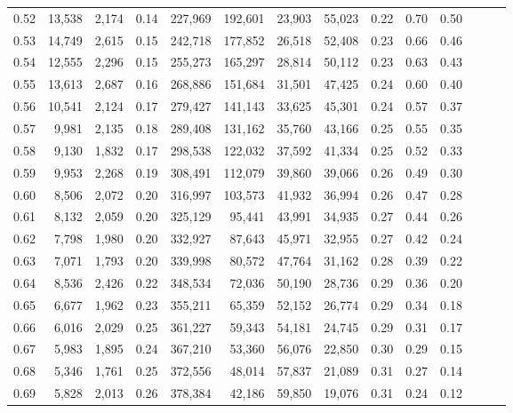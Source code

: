 \begin{tabular}{rrrrrrrrrrrrrr}
0.52 &  13,538 &  2,174 &  0.14 &  227,969 &  192,601 &  23,903 &  55,023 &  0.22 &  0.70 &      0.50 \\
0.53 &  14,749 &  2,615 &  0.15 &  242,718 &  177,852 &  26,518 &  52,408 &  0.23 &  0.66 &      0.46 \\
0.54 &  12,555 &  2,296 &  0.15 &  255,273 &  165,297 &  28,814 &  50,112 &  0.23 &  0.63 &      0.43 \\
0.55 &  13,613 &  2,687 &  0.16 &  268,886 &  151,684 &  31,501 &  47,425 &  0.24 &  0.60 &      0.40 \\
0.56 &  10,541 &  2,124 &  0.17 &  279,427 &  141,143 &  33,625 &  45,301 &  0.24 &  0.57 &      0.37 \\
0.57 &   9,981 &  2,135 &  0.18 &  289,408 &  131,162 &  35,760 &  43,166 &  0.25 &  0.55 &      0.35 \\
0.58 &   9,130 &  1,832 &  0.17 &  298,538 &  122,032 &  37,592 &  41,334 &  0.25 &  0.52 &      0.33 \\
0.59 &   9,953 &  2,268 &  0.19 &  308,491 &  112,079 &  39,860 &  39,066 &  0.26 &  0.49 &      0.30 \\
0.60 &   8,506 &  2,072 &  0.20 &  316,997 &  103,573 &  41,932 &  36,994 &  0.26 &  0.47 &      0.28 \\
0.61 &   8,132 &  2,059 &  0.20 &  325,129 &   95,441 &  43,991 &  34,935 &  0.27 &  0.44 &      0.26 \\
0.62 &   7,798 &  1,980 &  0.20 &  332,927 &   87,643 &  45,971 &  32,955 &  0.27 &  0.42 &      0.24 \\
0.63 &   7,071 &  1,793 &  0.20 &  339,998 &   80,572 &  47,764 &  31,162 &  0.28 &  0.39 &      0.22 \\
0.64 &   8,536 &  2,426 &  0.22 &  348,534 &   72,036 &  50,190 &  28,736 &  0.29 &  0.36 &      0.20 \\
0.65 &   6,677 &  1,962 &  0.23 &  355,211 &   65,359 &  52,152 &  26,774 &  0.29 &  0.34 &      0.18 \\
0.66 &   6,016 &  2,029 &  0.25 &  361,227 &   59,343 &  54,181 &  24,745 &  0.29 &  0.31 &      0.17 \\
0.67 &   5,983 &  1,895 &  0.24 &  367,210 &   53,360 &  56,076 &  22,850 &  0.30 &  0.29 &      0.15 \\
0.68 &   5,346 &  1,761 &  0.25 &  372,556 &   48,014 &  57,837 &  21,089 &  0.31 &  0.27 &      0.14 \\
0.69 &   5,828 &  2,013 &  0.26 &  378,384 &   42,186 &  59,850 &  19,076 &  0.31 &  0.24 &      0.12 \\

\end{tabular}
